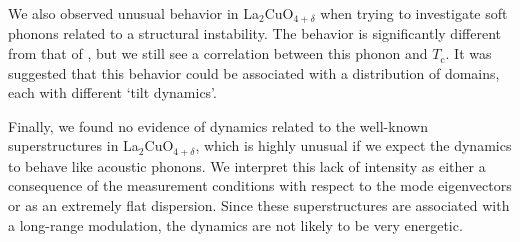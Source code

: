 We also observed unusual behavior in La$_2$CuO$_{4+\delta}$ when trying to investigate soft phonons related to a structural instability. The behavior is significantly different from that of \LSCO{}, but we still see a correlation between this phonon and $T_\text{c}$. It was suggested that this behavior could be associated with a distribution of domains, each with different `tilt dynamics'.

Finally, we found no evidence of dynamics related to the well-known superstructures in La$_2$CuO$_{4+\delta}$, which is highly unusual if we expect the dynamics to behave like acoustic phonons. We interpret this lack of intensity as either a consequence of the measurement conditions with respect to the mode eigenvectors or as an extremely flat dispersion. Since these superstructures are associated with a long-range modulation, the dynamics are not likely to be very energetic.